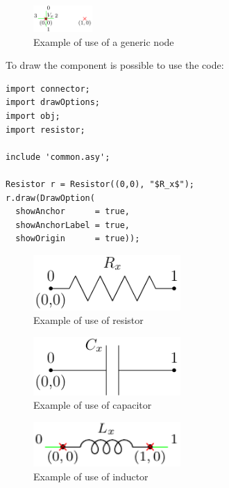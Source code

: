 \documentclass[a4paper,12pt]{report}
\begin{document}
\begin{figure}[h]
\centering
\includegraphics[width=0.2\textwidth]{nodeInfo}
\caption{Example of use of a generic node}
\label{nodeInfo} %
\end{figure}

To draw the component is possible to use the code:

\begin{lstlisting}
import connector;
import drawOptions;
import obj;
import resistor;

include 'common.asy';

Resistor r = Resistor((0,0), "$R_x$");
r.draw(DrawOption(
  showAnchor      = true,
  showAnchorLabel = true,
  showOrigin      = true));
\end{lstlisting}

\begin{figure}[h]
\centering
\includegraphics[width=0.5\textwidth]{resistorInfo}
\caption{Example of use of resistor}
\label{resistorInfo} %
\end{figure}

\begin{figure}[h]
\centering
\includegraphics[width=0.5\textwidth]{capacitorInfo}
\caption{Example of use of capacitor}
\label{capaciorInfo} %
\end{figure}

\begin{figure}[h]
\centering
\includegraphics[width=0.5\textwidth]{inductorInfo}
\caption{Example of use of inductor}
\label{inductorInfo} %
\end{figure}
\end{document}
